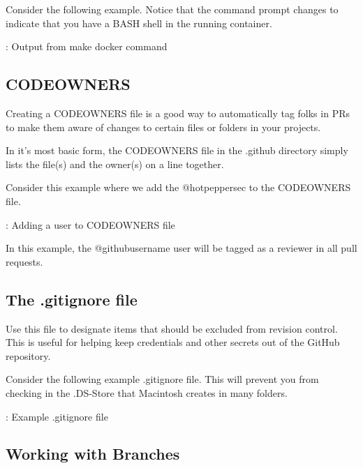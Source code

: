 \justify{}
Consider the following example. Notice that the command prompt changes to indicate that you have a BASH
shell in the running container.

\begin{mybox}{\thetcbcounter: Output from make docker command}
  
\end{mybox}

\subsection{CODEOWNERS}

\justify{}
Creating a CODEOWNERS file is a good way to automatically tag folks in PRs to make them aware of
changes to certain files or folders in your projects.

\justify{}
In it's most basic form, the CODEOWNERS file in the .github directory
simply lists the file(s) and the owner(s) on a line together.

\justify{}
Consider this example where we add the @hotpeppersec to the CODEOWNERS file.

\begin{mybox}{\thetcbcounter: Adding a user to CODEOWNERS file}
      
\end{mybox}

\justify{}
In this example, the @githubusername user will be tagged as a reviewer in all pull requests.

\subsection{The .gitignore file}

\justify{}
Use this file to designate items that should be excluded from revision
control. This is useful for helping keep credentials and other secrets out of the GitHub repository.

\justify{}
Consider the following example .gitignore file. This will prevent you from checking in the .DS-Store that
Macintosh creates in many folders.

\begin{mybox}{\thetcbcounter: Example .gitignore file}
      
\end{mybox}

\subsection{Working with Branches}

